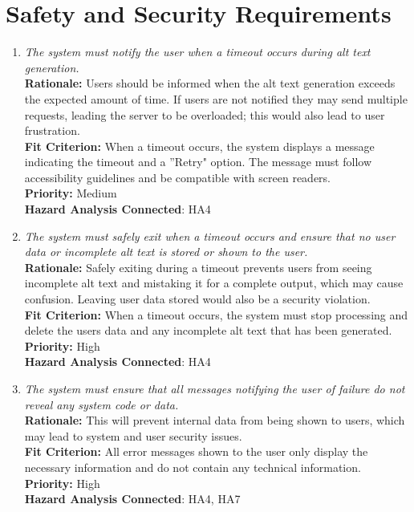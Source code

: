 \documentclass{article}
\begin{document}
    
\section{Safety and Security Requirements}
\begin{enumerate}[label=PR-SR-HA \arabic*., wide=0pt, leftmargin=*]
  \item \emph{The system must notify the user when a timeout occurs during alt text generation.}\\[2mm]
    {\bf Rationale:} Users should be informed when the alt text generation exceeds the expected amount of time. If users are not notified they may send multiple requests, leading the server to be overloaded; this would also lead to user frustration.\\
    {\bf Fit Criterion:} When a timeout occurs, the system displays a message indicating the timeout and a ''Retry" option. The message must follow accessibility guidelines and be compatible with screen readers.\\
    {\bf Priority:} Medium\\
    {\bf Hazard Analysis Connected}: HA4
  \item \emph{The system must safely exit when a timeout occurs and ensure that no user data or incomplete alt text is stored or shown to the user.}\\[2mm]
    {\bf Rationale:} Safely exiting during a timeout prevents users from seeing incomplete alt text and mistaking it for a complete output, which may cause confusion. Leaving user data stored would also be a security violation. \\
    {\bf Fit Criterion:} When a timeout occurs, the system must stop processing and delete the users data and any incomplete alt text that has been generated.\\
    {\bf Priority:} High\\
    {\bf Hazard Analysis Connected}: HA4
  \item \emph{The system must ensure that all messages notifying the user of failure do not reveal any system code or data. }\\[2mm]
    {\bf Rationale:} This will prevent internal data from being shown to users, which may lead to system and user security issues. \\
    {\bf Fit Criterion:} All error messages shown to the user only display the necessary information and do not contain any technical information.\\
    {\bf Priority:} High \\
    {\bf Hazard Analysis Connected}: HA4, HA7
\end{enumerate}
\end{document}
